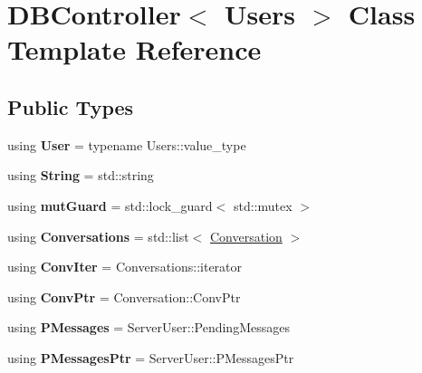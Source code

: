\hypertarget{classDBController}{}\section{D\+B\+Controller$<$ Users $>$ Class Template Reference}
\label{classDBController}
\subsection*{Public Types}
\begin{DoxyCompactItemize}
\item 
using {\bfseries User} = typename Users\+::value\+\_\+type\hypertarget{classDBController_ab621e56636010ffa790768031b6e1f58}{}\label{classDBController_ab621e56636010ffa790768031b6e1f58}

\item 
using {\bfseries String} = std\+::string\hypertarget{classDBController_afc05cf46913445cad521510401ba915c}{}\label{classDBController_afc05cf46913445cad521510401ba915c}

\item 
using {\bfseries mut\+Guard} = std\+::lock\+\_\+guard$<$ std\+::mutex $>$\hypertarget{classDBController_a2cc84030c82e94f79cd6f0da5a49a4ee}{}\label{classDBController_a2cc84030c82e94f79cd6f0da5a49a4ee}

\item 
using {\bfseries Conversations} = std\+::list$<$ \hyperlink{classConversation}{Conversation} $>$\hypertarget{classDBController_a72de5ce4988f74484b295dd24b699f55}{}\label{classDBController_a72de5ce4988f74484b295dd24b699f55}

\item 
using {\bfseries Conv\+Iter} = Conversations\+::iterator\hypertarget{classDBController_aede4241d22b2ab7a23a9311efc45b9c3}{}\label{classDBController_aede4241d22b2ab7a23a9311efc45b9c3}

\item 
using {\bfseries Conv\+Ptr} = Conversation\+::\+Conv\+Ptr\hypertarget{classDBController_ab3f8ef368bebfd895073943f20b4b302}{}\label{classDBController_ab3f8ef368bebfd895073943f20b4b302}

\item 
using {\bfseries P\+Messages} = Server\+User\+::\+Pending\+Messages\hypertarget{classDBController_a54f4ce4e32b7f1e2cfe5f0108e4e118b}{}\label{classDBController_a54f4ce4e32b7f1e2cfe5f0108e4e118b}

\item 
using {\bfseries P\+Messages\+Ptr} = Server\+User\+::\+P\+Messages\+Ptr\hypertarget{classDBController_ae2dd2067bcc0998090de4ddc1edd6be2}{}\label{classDBController_ae2dd2067bcc0998090de4ddc1edd6be2}

\end{DoxyCompactItemize}
